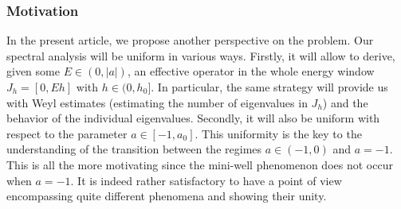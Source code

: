 \documentclass[10pt]{amsart}
\theoremstyle{plain}
\theoremstyle{definition}
\begin{document}
\subsubsection{Motivation}
In the present article, we propose another perspective on the problem. Our spectral analysis will be uniform in various ways. Firstly, it will allow to derive, given some $E\in(0,|a|)$, an effective operator in the whole energy window $J_h=[0,Eh]$ with $h\in (0,h_0]$. In particular, the same strategy will provide us with Weyl estimates (estimating the number of eigenvalues in $J_h$) and the behavior of the individual eigenvalues. Secondly, it will also be uniform with respect to the parameter $a\in[-1,a_0]$. This uniformity is the key to the understanding of the transition between the regimes $a\in(-1,0)$ and $a=-1$. This is all the more motivating since the mini-well phenomenon does not occur when $a=-1$. It is indeed rather satisfactory to have a point of view encompassing quite different phenomena and showing their unity.
\end{document}
